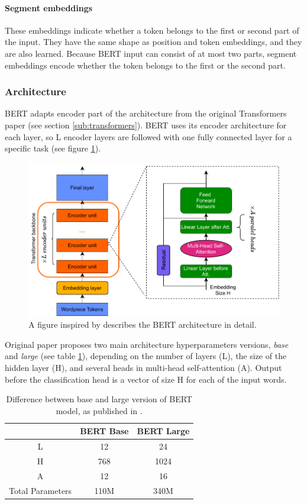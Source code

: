 \paragraph{Segment embeddings}
These embeddings indicate whether a token belongs to the first or second part of the input. They have the same shape as position and token embeddings, and they are also learned. Because BERT input can consist of at most two parts, segment embeddings encode whether the token belongs to the first or the second part.
\subsubsection{Architecture}
BERT adapts encoder part of the architecture from the original Transformers paper   \citep{Vaswani2017} (see section \ref{sub:transformers}).
BERT uses its encoder architecture for each layer, so L encoder layers are followed with one fully connected layer for a specific task (see figure \ref{pic:bert_arch}).

\begin{figure}[H]
\centering
\includegraphics[width=0.8\columnwidth]{../img/bert_arch.pdf}
\caption[The BERT architecture in detail]{A figure inspired by \citep{Ganesh2020} describes the BERT architecture in detail.}
\label{pic:bert_arch}
\end{figure}


 Original paper proposes two main architecture hyperparameters versions, \textit{base} and \textit{large} (see table \ref{Tab:base_large}), depending on the number of layers (L), the size of the hidden layer (H), and several heads in multi-head self-attention (A). Output before the classification head is a vector of size H for each of the input words. 

\begin{table}
\centering
\begin{tabular}{ |c|c|c| } 
 \hline
    & BERT Base &BERT Large \\ 
 \hline \hline
 L & 12 & 24 \\ \hline
 H & 768 & 1024 \\ \hline
  A & 12 & 16\\ \hline
Total Parameters & 110M & 340M \\\hline
\end{tabular}
\caption[The base and large BERT model comparison]{Difference between base and large version of BERT model, as published in 
\citep{Devlin2019}.
} 
\label{Tab:base_large}
\end{table}


